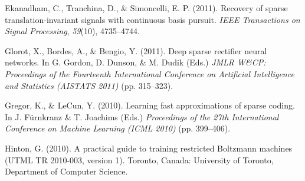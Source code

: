 \documentclass{article} %
\begin{document}
\begin{thebibliography}{100}

Ekanadham, C., Tranchina, D., \& Simoncelli, E. P. (2011). 
\newblock Recovery of sparse translation-invariant signals with continuous basis pursuit.
\newblock \emph{IEEE Transactions on Signal Processing}, \emph{59}(10), 4735--4744.


Glorot, X., Bordes, A., \& Bengio, Y. (2011).
\newblock Deep sparse rectifier neural networks. 
\newblock In G. Gordon, D. Dunson, \& M. Dudik (Eds.) \emph{JMLR W\&CP: Proceedings of the Fourteenth International Conference on Artificial Intelligence and Statistics (AISTATS 2011)} (pp. 315--323).

Gregor, K., \& LeCun, Y. (2010).
\newblock Learning fast approximations of sparse coding.
\newblock In J. F{\"u}rnkranz \& T. Joachims (Eds.) \emph{Proceedings of the 27th International Conference on Machine Learning (ICML 2010)} (pp. 399--406).



Hinton, G. (2010).
\newblock A practical guide to training restricted Boltzmann machines (UTML TR 2010-003, version 1).
\newblock Toronto, Canada: University of Toronto, Department of Computer Science.


\end{thebibliography}
\end{document}
